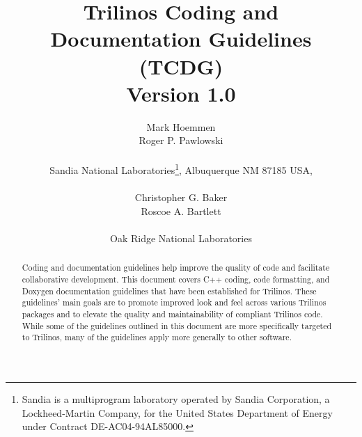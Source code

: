 \documentclass[pdf,11pt]{SANDreport}
\title{\center
Trilinos Coding and \\ Documentation Guidelines \\[2ex] (TCDG) \\[2ex]
Version 1.0 }
\author{
Mark Hoemmen \\
Roger P. Pawlowski \\ \\
%
Sandia National Laboratories\footnote{ Sandia is a multiprogram
laboratory operated by Sandia Corporation, a Lockheed-Martin Company,
for the United States Department of Energy under Contract
DE-AC04-94AL85000.}, Albuquerque NM 87185 USA, \\ \\
%
Christopher G. Baker \\
Roscoe A. Bartlett \\ \\
%
Oak Ridge National Laboratories
}
\date{}
\begin{document}

\maketitle

%

%
\begin{abstract}
%
  Coding and documentation guidelines help improve the quality of code
  and facilitate collaborative development.  This document covers C++
  coding, code formatting, and Doxygen documentation guidelines that
  have been established for Trilinos.  These guidelines' main goals
  are to promote improved look and feel across various Trilinos
  packages and to elevate the quality and maintainability of compliant
  Trilinos code.  While some of the guidelines outlined in this
  document are more specifically targeted to Trilinos, many of the
  guidelines apply more generally to other software.
%
\end{abstract}
%

%
%
%

%
\clearpage
\tableofcontents

\end{document}
